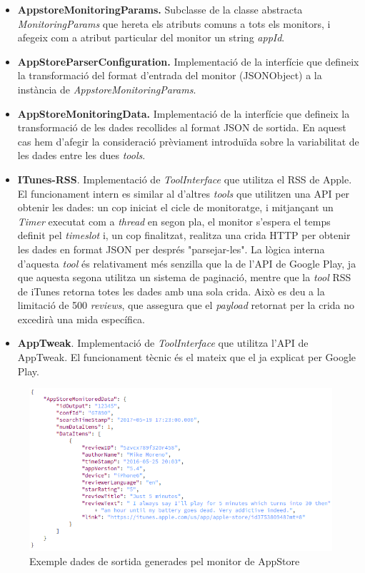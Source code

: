 \begin{itemize}
\item \textbf{AppstoreMonitoringParams.} Subclasse de la classe abstracta \textit{MonitoringParams} que hereta els atributs comuns a tots els monitors, i afegeix com a atribut particular del monitor un string \textit{appId}.
\item \textbf{AppStoreParserConfiguration.} Implementació de la interfície que defineix la transformació del format d'entrada del monitor (JSONObject) a la instància de \textit{AppstoreMonitoringParams}.
\item \textbf{AppStoreMonitoringData.} Implementació de la interfície que defineix la transformació de les dades recollides al format JSON de sortida. En aquest cas hem d'afegir la consideració prèviament introduïda sobre la variabilitat de les dades entre les dues \textit{tools}. 
\item \textbf{ITunes-RSS}. Implementació de \textit{ToolInterface} que utilitza el RSS de Apple. El funcionament intern es similar al d'altres \textit{tools} que utilitzen una API per obtenir les dades: un cop iniciat el cicle de monitoratge, i mitjançant un \textit{Timer} executat com a \textit{thread} en segon pla, el monitor s'espera el temps definit pel \textit{timeslot} i, un cop finalitzat, realitza una crida HTTP per obtenir les dades en format JSON per després "parsejar-les". La lògica interna d'aquesta \textit{tool} és relativament més senzilla que la de l'API de Google Play, ja que aquesta segona utilitza un sistema de paginació, mentre que la \textit{tool} RSS de iTunes retorna totes les dades amb una sola crida. Això es deu a la limitació de 500 \textit{reviews}, que assegura que el \textit{payload} retornat per la crida no excedirà una mida específica. 
\item \textbf{AppTweak}. Implementació de \textit{ToolInterface} que utilitza l'API de AppTweak. El funcionament tècnic és el mateix que el ja explicat per Google Play.
\end{itemize}

\begin{figure}[!h]
\centering
\includegraphics[width=14cm]{Figures/appstore-dades}
\decoRule
\caption[Exemple dades de sortida generades pel monitor de AppStore]{Exemple dades de sortida generades pel monitor de AppStore}
\label{fig:appstore-dades}
\end{figure}

